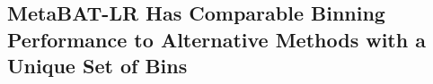 \documentclass[fleqn,10pt,lineno]{wlpeerj}
\providecommand{\DIFdelbegin}{} %
\newcommand{\DIFscaledelfig}{0.5}
\newlength{\DIFdelgraphicswidth} %
\newlength{\DIFdelgraphicsheight} %
\newcommand{\DIFdelincludegraphics}[2][]{%
\sbox{\DIFdelgraphicsbox}{\DIFOincludegraphics[#1]{#2}}%
\settoboxwidth{\DIFdelgraphicswidth}{\DIFdelgraphicsbox} %
\settoboxtotalheight{\DIFdelgraphicsheight}{\DIFdelgraphicsbox} %
\scalebox{\DIFscaledelfig}{%
\parbox[b]{\DIFdelgraphicswidth}{\usebox{\DIFdelgraphicsbox}\\[-\baselineskip] \rule{\DIFdelgraphicswidth}{0em}}\llap{\resizebox{\DIFdelgraphicswidth}{\DIFdelgraphicsheight}{%
\setlength{\unitlength}{\DIFdelgraphicswidth}%
\begin{picture}(1,1)%
\thicklines\linethickness{2pt} %
{\color[rgb]{1,0,0}\put(0,0){\framebox(1,1){}}}%
{\color[rgb]{1,0,0}\put(0,0){\line( 1,1){1}}}%
{\color[rgb]{1,0,0}\put(0,1){\line(1,-1){1}}}%
\end{picture}%
}\hspace*{3pt}}} %
} %
\DeclareRobustCommand{\DIFdelbegin}{\DIFOdelbegin \let\includegraphics\DIFdelincludegraphics} %
\begin{document}
\subsection*{MetaBAT-LR Has Comparable Binning Performance to Alternative Methods with a Unique Set of Bins}

\DIFdelbegin %
\end{document}
